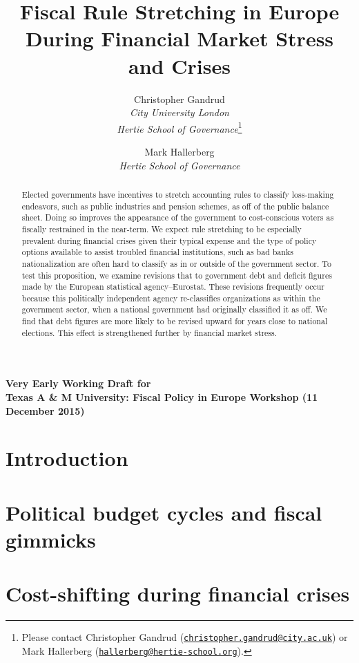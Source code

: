 \documentclass[]{article}
\title{Fiscal Rule Stretching in Europe During Financial Market Stress and Crises}
\author{Christopher Gandrud \\ \emph{City University London} \\ \emph{Hertie School of Governance}\footnote{Please contact Christopher Gandrud
(\href{mailto:christopher.gandrud@city.ac.uk}{\nolinkurl{christopher.gandrud@city.ac.uk}}) or Mark Hallerberg (\href{mailto:hallerberg@hertie-school.org}{\nolinkurl{hallerberg@hertie-school.org}}).}
\and
Mark Hallerberg \\ \emph{Hertie School of Governance}}
\begin{document}
\maketitle

\begin{center}
    \textbf{Very Early Working Draft for\\ Texas A \& M University: Fiscal Policy in Europe Workshop (11 December 2015)}
\end{center}

\begin{abstract}
    Elected governments have incentives to stretch accounting rules to classify loss-making endeavors, such as public industries and pension schemes, as off of the public balance sheet. Doing so improves the appearance of the government to cost-conscious voters as fiscally restrained in the near-term. We expect rule stretching to be especially prevalent during financial crises given their typical expense and the type of policy options available to assist troubled financial institutions, such as bad banks nationalization are often hard to classify as in or outside of the government sector. To test this proposition, we examine revisions that to government debt and deficit figures made by the European statistical agency--Eurostat. These revisions frequently occur because this politically independent agency re-classifies organizations as within the government sector, when a national government had originally classified it as off. We find that debt figures are more likely to be revised upward for years close to national elections. This effect is strengthened further by financial market stress.
\end{abstract}

\section{Introduction}

\section{Political budget cycles and fiscal gimmicks}

\cite{DeCastro2013} \cite{Alt2014}

\section{Cost-shifting during financial crises}

\cite{GandrudHallerberg2016}
\end{document}
